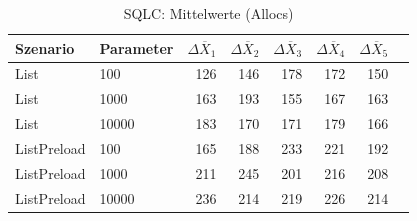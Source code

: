 
\begin{table}[ht]
\setlength{\extrarowheight}{-1pt}
\centering
\caption{SQLC: Mittelwerte (Allocs)}
\begin{tabular}{llrrrrrr}
\toprule
Szenario & Parameter & ${\Delta \overline{X}_1}$ & ${\Delta \overline{X}_2}$ & ${\Delta \overline{X}_3}$ & ${\Delta \overline{X}_4}$ & ${\Delta \overline{X}_5}$ \\
\midrule
	List & 100 & 126 & 146 & 178 & 172 & 150 \\
	List & 1000 & 163 & 193 & 155 & 167 & 163 \\
	List & 10000 & 183 & 170 & 171 & 179 & 166 \\
	ListPreload & 100 & 165 & 188 & 233 & 221 & 192 \\
	ListPreload & 1000 & 211 & 245 & 201 & 216 & 208 \\
	ListPreload & 10000 & 236 & 214 & 219 & 226 & 214 \\
\bottomrule
\end{tabular}
\label{tab:mittelwerte_sqlc_allocs}
\end{table}
	